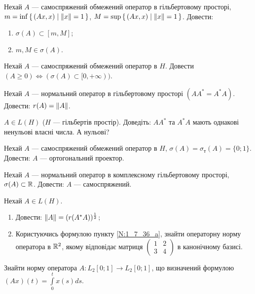 
\begin{exercise}\label{N:1_7_30}
    Нехай $A$ --- самоспряжений обмежений оператор в гільбертовому просторі,
    $m = \inf\set{\left(Ax, x\right) \mid \left\lVert x\right\rVert=1}$,
    $M = \sup\set{\left(Ax, x\right) \mid \left\lVert x\right\rVert=1}$.
    Довести:
    \begin{enumerate}
        \item $\sigma(A) \subset [m,M]$;
        \item $m,M \in \sigma(A)$.
    \end{enumerate}
\end{exercise}

\begin{exercise}
    Нехай $A$ --- самоспряжений обмежений оператор в $H$. Довести $(A \geq 0)
    \Leftrightarrow (\sigma(A) \subset [0,+\infty))$.
\end{exercise}

\begin{exercise}
    Нехай $A$ --- нормальний оператор в гільбертовому просторі $(AA^* = A^* A)$.
    Довести: $r(A) = \left\lVert A\right\rVert$.
\end{exercise}

\begin{exercise}\label{N:1_7_33}
    $A \in L(H)$ ($H$ --- гільбертів простір). Доведіть: $AA^*$ та $A^* A$ мають
    однакові ненульові власні числа. А нульові?
\end{exercise}

\begin{exercise}
    Нехай $A$ --- самоспряжений обмежений оператор в $H$, $\sigma(A) = \sigma_{\text{т}}(A)
    = \{0;1\}$. Довести: $A$ --- ортогональний проектор.
\end{exercise}

\begin{exercise*}
    Нехай $A$ --- нормальний оператор в комплексному гільбертовому просторі,
    $\sigma(A) \subset \mathbb{R}$. Довести: $A$ --- самоспряжений.
\end{exercise*}

\begin{exercise}
    Нехай $A \in L(H)$.
    \begin{enumerate}
        \item\label{N:1_7_36_a} Довести: $\left\lVert A\right\rVert = (r(A^*A))^{\frac{1}{2}}$;
        \item Користуючись формулою пункту \ref{N:1_7_36_a},  знайти операторну
        норму оператора в $\mathbb{R}^2$, якому відповідає матриця $\begin{pmatrix}
        1 & 2 \\ 3 & 4 \end{pmatrix}$ в канонічному базисі.
    \end{enumerate}
\end{exercise}

\begin{exercise}
    Знайти норму оператора $A: L_2[0;1] \to L_2[0;1]$, що визначений формулою
    $(Ax)(t) = \int\limits^t_0 x(s)ds$.
\end{exercise}